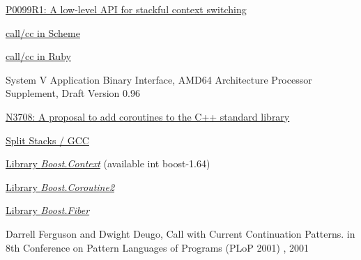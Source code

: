 \begin{thebibliography}{99}

        \href{http://www.open-std.org/jtc1/sc22/wg21/docs/papers/2016/p0099r1.pdf}
        {P0099R1: A low-level API for stackful context switching}

        \href{http://community.schemewiki.org/?call-with-current-continuation}
        {call/cc in Scheme}

        \href{http://gnuu.org/2009/03/21/demystifying-continuations-in-ruby}
        {call/cc in Ruby}

        {System V Application Binary Interface, AMD64 Architecture Processor Supplement,
        Draft Version 0.96}

        \href{http://www.open-std.org/jtc1/sc22/wg21/docs/papers/2013/n3708.pdf}
        {N3708: A proposal to add coroutines to the C++ standard library}

        \href{http://gcc.gnu.org/wiki/SplitStacks}
        {Split Stacks / GCC}

        \href{http://www.boost.org/doc/libs/release/libs/context/doc/html/index.html}
        {Library \emph{Boost.Context}} (\cc available int boost-1.64)

        \href{http://www.boost.org/doc/libs/release/libs/coroutine2/doc/html/index.html}
        {Library \emph{Boost.Coroutine2}}

        \href{http://www.boost.org/doc/libs/release/libs/fiber/doc/html/index.html}
        {Library \emph{Boost.Fiber}}

        {Darrell Ferguson and Dwight Deugo, Call with Current Continuation Patterns.
        in 8th Conference on Pattern Languages of Programs (PLoP 2001) , 2001}

\end{thebibliography}
